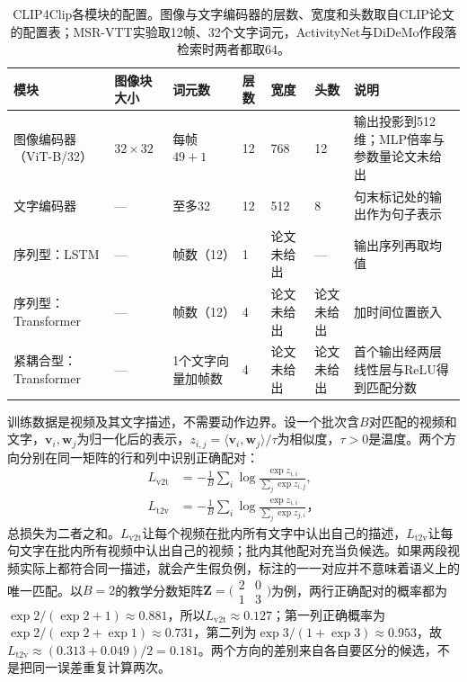 \begin{table}[tbp]
  \centering
  \small
  \begin{tabularx}{\linewidth}{@{}lXXlllX@{}}
    \toprule
    模块 & 图像块大小 & 词元数 & 层数 & 宽度 & 头数 & 说明\\
    \midrule
    图像编码器（ViT-B/32） & $32\times32$ & 每帧$49+1$ & 12 & 768 & 12 & 输出投影到512维；MLP倍率与参数量论文未给出\\
    文字编码器 & — & 至多32 & 12 & 512 & 8 & 句末标记处的输出作为句子表示\\
    序列型：LSTM & — & 帧数（12） & 1 & 论文未给出 & — & 输出序列再取均值\\
    序列型：Transformer & — & 帧数（12） & 4 & 论文未给出 & 论文未给出 & 加时间位置嵌入\\
    紧耦合型：Transformer & — & 1个文字向量加帧数 & 4 & 论文未给出 & 论文未给出 & 首个输出经两层线性层与ReLU得到匹配分数\\
    \bottomrule
  \end{tabularx}
  \caption{CLIP4Clip各模块的配置。图像与文字编码器的层数、宽度和头数取自CLIP论文的配置表；MSR-VTT实验取12帧、32个文字词元，ActivityNet与DiDeMo作段落检索时两者都取64。}
  \label{tab:vision-video-clip4clip-config}
\end{table}

训练数据是视频及其文字描述，不需要动作边界。设一个批次含$B$对匹配的视频和文字，$\bm{v}_i,\bm{w}_j$为归一化后的表示，$z_{i,j}=\langle\bm{v}_i,\bm{w}_j\rangle/\tau$为相似度，$\tau>0$是温度。两个方向分别在同一矩阵的行和列中识别正确配对：
\begin{equation}
  \begin{aligned}
    L_{\mathrm{v2t}}&=-\frac{1}{B}\sum_i
      \log\frac{\exp z_{i,i}}{\sum_j\exp z_{i,j}},\\
    L_{\mathrm{t2v}}&=-\frac{1}{B}\sum_i
      \log\frac{\exp z_{i,i}}{\sum_j\exp z_{j,i}}\text{，}
  \end{aligned}
  \label{eq:vision-video-retrieval-loss}
\end{equation}
总损失为二者之和。$L_{\mathrm{v2t}}$让每个视频在批内所有文字中认出自己的描述，$L_{\mathrm{t2v}}$让每句文字在批内所有视频中认出自己的视频；批内其他配对充当负候选。如果两段视频实际上都符合同一描述，就会产生假负例，标注的一一对应并不意味着语义上的唯一匹配。以$B=2$的教学分数矩阵$\bm{Z}=\bigl(\begin{smallmatrix}2&0\\1&3\end{smallmatrix}\bigr)$为例，两行正确配对的概率都为$\exp2/(\exp2+1)\approx0.881$，所以$L_{\mathrm{v2t}}\approx0.127$；第一列正确概率为$\exp2/(\exp2+\exp1)\approx0.731$，第二列为$\exp3/(1+\exp3)\approx0.953$，故$L_{\mathrm{t2v}}\approx(0.313+0.049)/2=0.181$。两个方向的差别来自各自要区分的候选，不是把同一误差重复计算两次。


